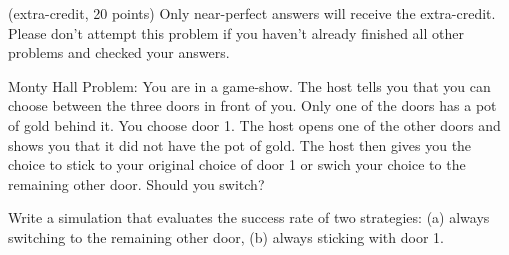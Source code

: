 \documentclass[addpoints,12pt]{exam}
\begin{document}
\begin{questions}
\newpage
\question (extra-credit, 20 points) Only near-perfect answers will receive the extra-credit. Please don't attempt this problem if you haven't already finished all other problems and checked your answers. 

Monty Hall Problem: You are in a game-show. The host tells you that you can choose between the three doors in front of you. Only one of the doors has a pot of gold behind it. You choose door 1. The host opens one of the other doors and shows you that it did not have the pot of gold. The host then gives you the choice to stick to your original choice of door 1 or swich your choice to the remaining other door. Should you switch? 

Write a simulation that evaluates the success rate of two strategies: 
(a) always switching to the remaining other door, 
(b) always sticking with door 1. 

\end{questions}
\end{document}

